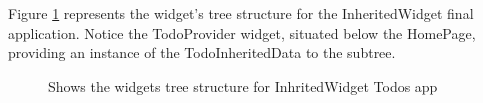 Figure \ref{fig:widget_tree_structure_inheritedwidget} represents the widget's tree structure for the InheritedWidget final application. Notice the TodoProvider widget, situated below the HomePage, providing an instance of the TodoInheritedData to the subtree.

\begin{figure}[H]
    \centering
    \quad
    \caption{Shows the widgets tree structure for InhritedWidget Todos app}
    \label{fig:widget_tree_structure_inheritedwidget}
\end{figure}
